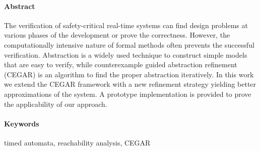 \cleardoublepage

\paragraph*{Abstract}
{}
\thispagestyle{plain}

The verification of safety-critical real-time systems can find design problems at various phases of the development or prove the correctness. However, 
the computationally intensive nature of formal methods often prevents the successful verification. Abstraction is a widely used technique to construct simple models that are easy to verify, while counterexample guided abstraction refinement (CEGAR) is an algorithm to find the proper abstraction iteratively. In this work we extend the CEGAR framework with a new refinement strategy yielding better approximations of the system. A prototype implementation is provided to prove the applicability of our approach.


\paragraph{Keywords} timed automata, reachability analysis,
CEGAR
